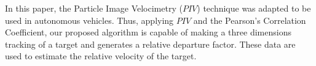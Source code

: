 In this paper, the Particle Image Velocimetry ($PIV$) technique was adapted to be used in autonomous vehicles.
Thus, applying $PIV$ and the Pearson’s Correlation Coefficient, our proposed algorithm 
is capable of making a three dimensions tracking of a target 
and generates a relative departure factor. These data are used to estimate the 
relative velocity of the target.